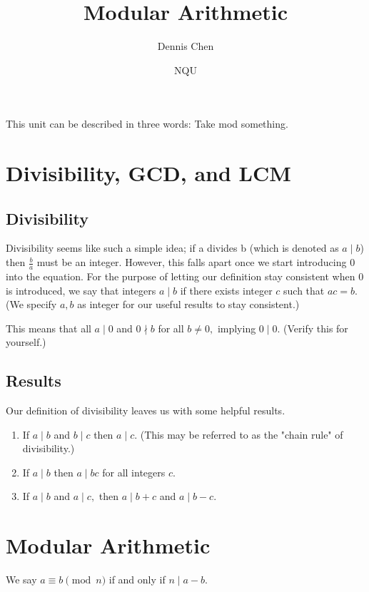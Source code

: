 \documentclass[mast]{lucky}
\title{Modular Arithmetic}
\author{Dennis Chen}
\date{NQU}
\begin{document}
\maketitle

This unit can be described in three words: Take mod something.

\section{Divisibility, GCD, and LCM}
\subsection{Divisibility}
Divisibility seems like such a simple idea; if a divides b (which is denoted as $a\mid b$) then $\frac{b}{a}$ must be an integer. However, this falls apart once we start introducing $0$ into the equation. For the purpose of letting our definition stay consistent when $0$ is introduced, we say that integers $a\mid b$ if there exists integer $c$ such that $ac=b.$ (We specify $a,b$ as integer for our useful results to stay consistent.)

This means that all $a\mid 0$ and $0\nmid b$ for all $b\neq 0,$ implying $0\mid 0.$ (Verify this for yourself.)
\subsection{Results}
Our definition of divisibility leaves us with some helpful results.
\begin{fact}
\hfill
\begin{enumerate}
    \item If $a\mid b$ and $b\mid c$ then $a\mid c.$ (This may be referred to as the "chain rule" of divisibility.)
    
    \item If $a\mid b$ then $a\mid bc$ for all integers $c.$
    
    \item If $a\mid b$ and $a\mid c,$ then $a\mid b+c$ and $a\mid b-c.$
\end{enumerate}
\end{fact}

\section{Modular Arithmetic}
\begin{defi}
We say $a\equiv b\pmod {n}$ if and only if $n\mid a-b.$
\end{defi}
\end{document}
